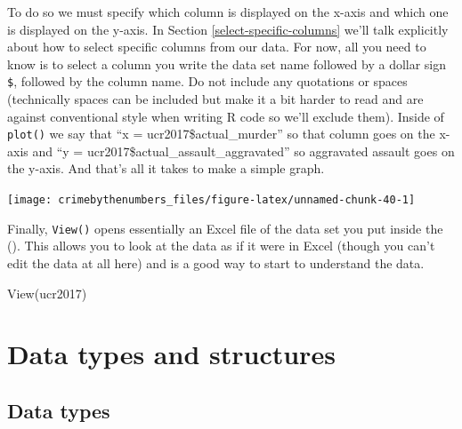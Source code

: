 \documentclass[
]{krantz}
\makeatletter
\newenvironment{Shaded}{\begin{snugshade}}{\end{snugshade}}
\newcommand{\AttributeTok}[1]{\textcolor[rgb]{0.61,0.61,0.61}{#1}}
\newcommand{\FunctionTok}[1]{\textcolor[rgb]{0,0,0}{#1}}
\newcommand{\NormalTok}[1]{#1}
\newcommand{\SpecialCharTok}[1]{\textcolor[rgb]{0,0,0}{#1}}
\newenvironment{kframe}{%
\medskip{}
\setlength{\fboxsep}{.8em}
 \def\at@end@of@kframe{}%
 \ifinner\ifhmode%
  \def\at@end@of@kframe{\end{minipage}}%
  \begin{minipage}{\columnwidth}%
 \fi\fi%
 \def\FrameCommand##1{\hskip\@totalleftmargin \hskip-\fboxsep
 \colorbox{shadecolor}{##1}\hskip-\fboxsep
     \hskip-\linewidth \hskip-\@totalleftmargin \hskip\columnwidth}%
 \MakeFramed {\advance\hsize-\width
   \@totalleftmargin\z@ \linewidth\hsize
   \@setminipage}}%
 {\par\unskip\endMakeFramed%
 \at@end@of@kframe}
\renewenvironment{Shaded}{\begin{kframe}}{\end{kframe}}
\makeatother
\begin{document}
To do so we must specify which column is displayed on the
x-axis and which one is displayed on the y-axis. In Section
\ref{select-specific-columns} we'll talk explicitly about
how to select specific columns from our data. For now, all
you need to know is to select a column you write the data
set name followed by a dollar sign \texttt{\$}, followed by
the column name. Do not include any quotations or spaces
(technically spaces can be included but make it a bit harder
to read and are against conventional style when writing R
code so we'll exclude them). Inside of \texttt{plot()} we
say that ``x = ucr2017\$actual\_murder'' so that column goes
on the x-axis and ``y =
ucr2017\$actual\_assault\_aggravated'' so aggravated assault
goes on the y-axis. And that's all it takes to make a simple
graph.

\begin{Shaded}
\end{Shaded}

\begin{center}\texttt{[image: crimebythenumbers\_files/figure-latex/unnamed-chunk-40-1]} \end{center}

Finally, \texttt{View()} opens essentially an Excel file of
the data set you put inside the (). This allows you to look
at the data as if it were in Excel (though you can't edit
the data at all here) and is a good way to start to
understand the data.

\begin{Shaded}
\begin{Highlighting}[]
\FunctionTok{View}\NormalTok{(ucr2017)}
\end{Highlighting}
\end{Shaded}

\hypertarget{data-types}{%
\chapter{Data types and structures}\label{data-types}}

\hypertarget{section-data-types}{%
\section{Data types}\label{section-data-types}}
\end{document}
